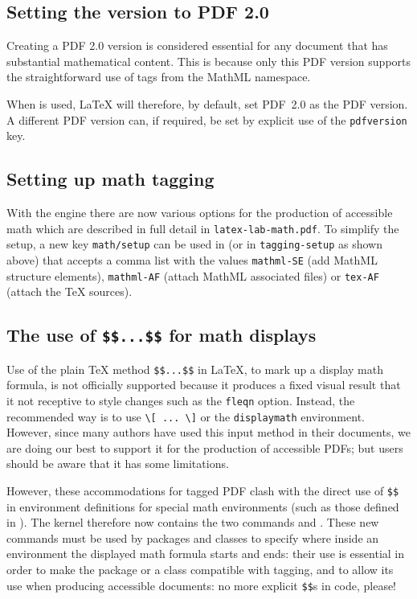 \documentclass{ltnews}
\providecommand\env[1]{\texttt{#1}}
\providecommand\LuaTeX{\hologo{LuaTeX}}
\providecommand\env[1]{\texttt{#1}}
\begin{document}
\subsection{Setting the version to PDF 2.0}

Creating a PDF 2.0 version is considered essential for any document
that has substantial mathematical content.  This is because only this
PDF version supports the straightforward use of tags from the MathML
namespace.

When  is used, \LaTeX{} will therefore, by
default, set PDF~2.0 as the PDF version.  A different PDF version can,
if required, be set by explicit use of the \texttt{pdfversion} key.




\subsection{Setting up math tagging}

With the \LuaTeX{} engine there are now various options for the
production of accessible math which are described in full detail in
\texttt{latex-lab-math.pdf}. To simplify the setup, a new key
\texttt{math/setup} can be used in  (or in
\texttt{tagging-setup} as shown above) that accepts a comma list with
the values \texttt{mathml-SE} (add MathML structure elements),
\texttt{mathml-AF} (attach MathML associated files) or \texttt{tex-AF}
(attach the \TeX{} sources).


\subsection{The use of \texttt{\$\$...\$\$} for math displays}

Use of the plain \TeX{} method \verb=$$...$$= in \LaTeX{}, to mark up
a display math formula, is not officially supported because it
produces a fixed visual result that it not receptive to style changes
such as the \texttt{fleqn} option. Instead, the recommended way is to
use \verb=\[ ... \]= or the \env{displaymath} environment. However,
since many authors have used this input method in their documents, we
are doing our best to support it for the production of accessible
PDFs; but users should be aware that it has some limitations.

However, these accommodations for tagged PDF clash with the direct use
of \verb=$$= in environment definitions for special math environments
(such as those defined in ).  The kernel therefore now
contains the two commands  and
.  These new commands must be used by packages
and classes to specify where inside an environment the displayed math
formula starts and ends: their use is essential in order to make the
package or a class compatible with tagging, and to allow its use when
producing accessible documents: no more explicit \texttt{\$\$}s in
code, please!
\end{document}
